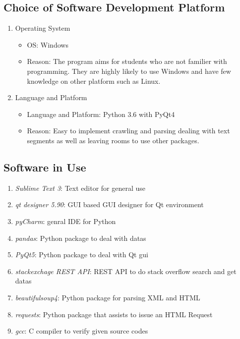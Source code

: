 \documentclass[conference]{IEEEtran}
\begin{document}
\subsection{Choice of Software Development Platform} %
\label{sub:choice_of_software_development_platform}

\begin{enumerate}
  \item Operating System
  \begin{itemize}
    \item OS: Windows
    \item Reason: The program aims for students who are not familier with programming. They are highly likely to use Windows and have few knowledge on other platform such as Linux.
  \end{itemize}
  \item Language and Platform
  \begin{itemize}
    \item Language and Platform: Python 3.6 with PyQt4
    \item Reason: Easy to implement crawling and parsing dealing with text segments as well as leaving rooms to use other packages.
  \end{itemize}
\end{enumerate}
\textit{}


\subsection{Software in Use} %
\label{sub:software_in_use}

\begin{enumerate}
  \item \textit{Sublime Text 3}: Text editor for general use
  \item \textit{qt designer 5.90}: GUI based GUI designer for Qt environment
  \item \textit{pyCharm}: genral IDE for Python
  \item \textit{pandas}: Python package to deal with datas
  \item \textit{PyQt5}: Python package to deal with Qt gui
  \item \textit{stackexchage REST API}: REST API to do stack overflow search and get datas
  \item \textit{beautifulsoup4}: Python package for parsing XML and HTML
  \item \textit{requests}: Python package that assists to issue an HTML Request
  \item \textit{gcc}: C compiler to verify given source codes
\end{enumerate}
\textit{}
\end{document}
